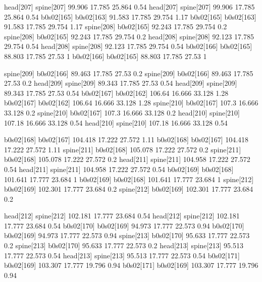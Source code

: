 head[207]    spine[207]    99.906    17.785    25.864    0.54
head[207]    spine[207]    99.906    17.785    25.864    0.54
b0s02[165]    b0s02[163]    91.583    17.785    29.754    1.17
b0s02[165]    b0s02[163]    91.583    17.785    29.754    1.17
spine[208]    b0s02[165]    92.243    17.785    29.754    0.2
spine[208]    b0s02[165]    92.243    17.785    29.754    0.2
head[208]    spine[208]    92.123    17.785    29.754    0.54
head[208]    spine[208]    92.123    17.785    29.754    0.54
b0s02[166]    b0s02[165]    88.803    17.785    27.53    1
b0s02[166]    b0s02[165]    88.803    17.785    27.53    1


spine[209]    b0s02[166]    89.463    17.785    27.53    0.2
spine[209]    b0s02[166]    89.463    17.785    27.53    0.2
head[209]    spine[209]    89.343    17.785    27.53    0.54
head[209]    spine[209]    89.343    17.785    27.53    0.54
b0s02[167]    b0s02[162]    106.64    16.666    33.128    1.28
b0s02[167]    b0s02[162]    106.64    16.666    33.128    1.28
spine[210]    b0s02[167]    107.3    16.666    33.128    0.2
spine[210]    b0s02[167]    107.3    16.666    33.128    0.2
head[210]    spine[210]    107.18    16.666    33.128    0.54
head[210]    spine[210]    107.18    16.666    33.128    0.54


b0s02[168]    b0s02[167]    104.418    17.222    27.572    1.11
b0s02[168]    b0s02[167]    104.418    17.222    27.572    1.11
spine[211]    b0s02[168]    105.078    17.222    27.572    0.2
spine[211]    b0s02[168]    105.078    17.222    27.572    0.2
head[211]    spine[211]    104.958    17.222    27.572    0.54
head[211]    spine[211]    104.958    17.222    27.572    0.54
b0s02[169]    b0s02[168]    101.641    17.777    23.684    1
b0s02[169]    b0s02[168]    101.641    17.777    23.684    1
spine[212]    b0s02[169]    102.301    17.777    23.684    0.2
spine[212]    b0s02[169]    102.301    17.777    23.684    0.2


head[212]    spine[212]    102.181    17.777    23.684    0.54
head[212]    spine[212]    102.181    17.777    23.684    0.54
b0s02[170]    b0s02[169]    94.973    17.777    22.573    0.94
b0s02[170]    b0s02[169]    94.973    17.777    22.573    0.94
spine[213]    b0s02[170]    95.633    17.777    22.573    0.2
spine[213]    b0s02[170]    95.633    17.777    22.573    0.2
head[213]    spine[213]    95.513    17.777    22.573    0.54
head[213]    spine[213]    95.513    17.777    22.573    0.54
b0s02[171]    b0s02[169]    103.307    17.777    19.796    0.94
b0s02[171]    b0s02[169]    103.307    17.777    19.796    0.94


